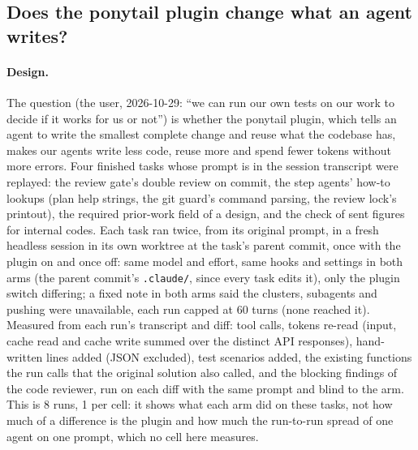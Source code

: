 \documentclass[11pt]{article}
\newcommand{\code}[1]{\texttt{#1}}
\begin{document}
\subsection{Does the ponytail plugin change what an agent writes?}\label{sec:ponytail-ab}

\paragraph{Design.} The question (the user, 2026-10-29: ``we can run our own tests on our work to decide if it works for
us or not'') is whether the ponytail plugin, which tells an agent to write the smallest complete change and reuse what
the codebase has, makes our agents write less code, reuse more and spend fewer tokens without more errors. Four finished
tasks whose prompt is in the session transcript were replayed: the review gate's double review on commit, the step
agents' how-to lookups (plan help strings, the git guard's command parsing, the review lock's printout), the required
prior-work field of a design, and the check of sent figures for internal codes. Each task ran twice, from its original
prompt, in a fresh headless session in its own worktree at the task's parent commit, once with the plugin on and once
off: same model and effort, same hooks and settings in both arms (the parent commit's \code{.claude/}, since every task
edits it), only the plugin switch differing; a fixed note in both arms said the clusters, subagents and pushing were
unavailable, each run capped at 60 turns (none reached it). Measured from each run's transcript and diff: tool calls,
tokens re-read (input, cache read and cache write summed over the distinct API responses), hand-written lines added (JSON
excluded), test scenarios added, the existing functions the run calls that the original solution also called, and the
blocking findings of the code reviewer, run on each diff with the same prompt and blind to the arm. This is 8 runs, 1
per cell: it shows what each arm did on these tasks, not how much of a difference is the plugin and how much the
run-to-run spread of one agent on one prompt, which no cell here measures.
\end{document}
